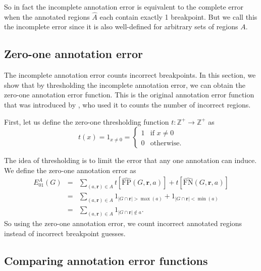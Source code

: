 \documentclass{jsfds} %
\renewcommand{\r}{ \mathbf{ r} }
\begin{document}
So in fact the incomplete annotation error is equivalent to the
complete error when the annotated regions $\hat A$ each contain
exactly 1 breakpoint. But we call this the incomplete error since it
is also well-defined for arbitrary sets of regions $A$.


\newpage

\subsection{Zero-one annotation error}
\label{sec:zero-one}

The incomplete annotation error counts incorrect breakpoints. In this
section, we show that by thresholding the incomplete annotation error,
we can obtain the zero-one annotation error function. This is the
original annotation error function that was introduced by
\citet{HOCKING-breakpoints}, who used it to counts the number of
incorrect regions.

First, let us define the zero-one thresholding function
$t:\mathbb Z^+\rightarrow\mathbb Z^+$ as
\begin{equation}
  \label{eq:thresholding}
  t(x)=1_{x\neq 0} =
  \begin{cases}
    1 & \text{if }x\neq 0\\
    0 & \text{otherwise}.
  \end{cases}
\end{equation}

The idea of thresholding is to limit the error that any one annotation
can induce. We define the zero-one annotation error as
\begin{eqnarray}
  \label{eq:ann01err}
  E_{01}^{A}(G)
&=&\nonumber
 \sum_{(a, \r)\in A} 
t\left[\hat{\text{FP}}(G,\r,a)\right]+
t\left[\hat{\text{FN}}(G,\r,a)\right]\\
&=&\nonumber
 \sum_{(a, \r)\in A} 
1_{|G\cap\r|>\max(a)}+
1_{|G\cap \r|<\min(a)}\\
&=&
 \sum_{(a, \r)\in A} 
1_{|G\cap\r|\not\in a}.
\end{eqnarray}
So using the zero-one annotation error, we count incorrect annotated
regions instead of incorrect breakpoint guesses.  

\newpage

\subsection{Comparing annotation error functions}
\end{document}
